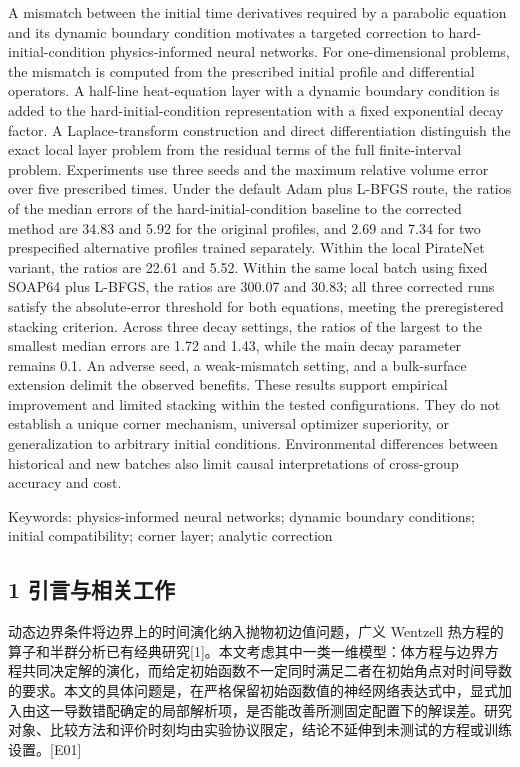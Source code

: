 \documentclass[11pt,a4paper]{article}
\begin{document}
A mismatch between the initial time derivatives required by a parabolic equation and its dynamic boundary condition motivates a targeted correction to hard-initial-condition physics-informed neural networks. For one-dimensional problems, the mismatch is computed from the prescribed initial profile and differential operators. A half-line heat-equation layer with a dynamic boundary condition is added to the hard-initial-condition representation with a fixed exponential decay factor. A Laplace-transform construction and direct differentiation distinguish the exact local layer problem from the residual terms of the full finite-interval problem. Experiments use three seeds and the maximum relative volume error over five prescribed times. Under the default Adam plus L-BFGS route, the ratios of the median errors of the hard-initial-condition baseline to the corrected method are 34.83 and 5.92 for the original profiles, and 2.69 and 7.34 for two prespecified alternative profiles trained separately. Within the local PirateNet variant, the ratios are 22.61 and 5.52. Within the same local batch using fixed SOAP64 plus L-BFGS, the ratios are 300.07 and 30.83; all three corrected runs satisfy the absolute-error threshold for both equations, meeting the preregistered stacking criterion. Across three decay settings, the ratios of the largest to the smallest median errors are 1.72 and 1.43, while the main decay parameter remains 0.1. An adverse seed, a weak-mismatch setting, and a bulk-surface extension delimit the observed benefits. These results support empirical improvement and limited stacking within the tested configurations. They do not establish a unique corner mechanism, universal optimizer superiority, or generalization to arbitrary initial conditions. Environmental differences between historical and new batches also limit causal interpretations of cross-group accuracy and cost.

Keywords: physics-informed neural networks; dynamic boundary conditions; initial compatibility; corner layer; analytic correction

\subsection{1 引言与相关工作}\label{ux5f15ux8a00ux4e0eux76f8ux5173ux5de5ux4f5c}

动态边界条件将边界上的时间演化纳入抛物初边值问题，广义 Wentzell 热方程的算子和半群分析已有经典研究{[}1{]}。本文考虑其中一类一维模型：体方程与边界方程共同决定解的演化，而给定初始函数不一定同时满足二者在初始角点对时间导数的要求。本文的具体问题是，在严格保留初始函数值的神经网络表达式中，显式加入由这一导数错配确定的局部解析项，是否能改善所测固定配置下的解误差。研究对象、比较方法和评价时刻均由实验协议限定，结论不延伸到未测试的方程或训练设置。{[}E01{]}
\end{document}
